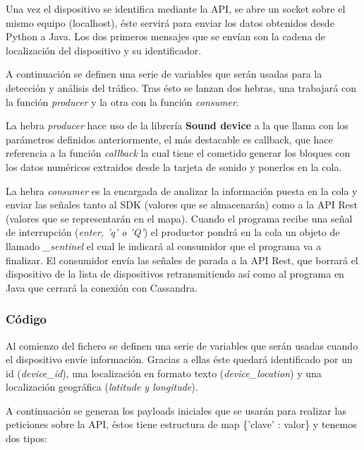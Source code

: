 \bigskip

Una vez el dispositivo se identifica mediante la API, se abre un socket sobre el mismo equipo (localhost), éste servirá para enviar los datos obtenidos desde Python a Java. Los dos primeros mensajes que se envían son la cadena de localización del dispositivo y su identificador.

\bigskip

A continuación se definen una serie de variables que serán usadas para la detección y análisis del tráfico.
Tras ésto se lanzan dos hebras, una trabajará con la función \textit{producer} y la otra con la función \textit{consumer}.

\bigksip

La hebra \textit{producer} hace uso de la librería \textbf{Sound device} a la que llama con los parámetros definidos anteriormente, el más destacable es callback, que hace referencia a la función \textit{callback} la cual tiene el cometido generar los bloques con los datos numéricos extraidos desde la tarjeta de sonido y ponerlos en la cola.
\bigskip

La hebra \textit{consumer} es la encargada de analizar la información puesta en la cola y enviar las señales tanto al SDK (valores que se almacenarán) como a la API Rest (valores que se representarán en el mapa). Cuando el programa recibe una señal de interrupción (\textit{enter, 'q' o 'Q'}) el productor pondrá en la cola un objeto de llamado \textit{\_sentinel} el cual le indicará al consumidor que el programa va a finalizar. El consumidor envía las señales de parada a la API Rest, que borrará el dispositivo de la lista de dispositivos retransmitiendo así como al programa en Java que cerrará la conexión con Cassandra.

\newpage
\subsubsection{Código}

Al comienzo del fichero se definen una serie de variables que serán usadas cuando el dispositivo envíe información. Gracias a ellas éste quedará identificado por un id (\textit{device\_id}), una localización en formato texto (\textit{device\_location}) y una localización geográfica (\textit{latitude y longitude}).

A continuación se generan los payloads iniciales que se usarán para realizar las peticiones sobre la API, éstos tiene estructura de map \{'clave' : valor\} y tenemos dos tipos:


